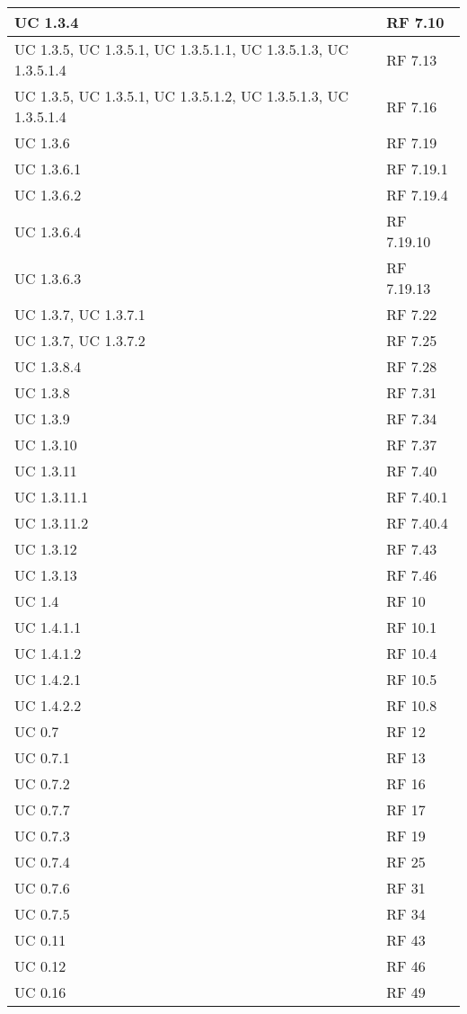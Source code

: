 {\begin{longtable} [c]{| p{4cm} | p{4cm} |}
 \hline 
UC 1.3.4 & RF 7.10\\ 
 \hline 
UC 1.3.5, UC 1.3.5.1, UC 1.3.5.1.1, UC 1.3.5.1.3, UC 1.3.5.1.4 & RF 7.13\\ 
 \hline 
UC 1.3.5, UC 1.3.5.1, UC 1.3.5.1.2, UC 1.3.5.1.3, UC 1.3.5.1.4 & RF 7.16\\ 
 \hline 
UC 1.3.6 & RF 7.19\\ 
 \hline 
UC 1.3.6.1 & RF 7.19.1\\ 
 \hline 
UC 1.3.6.2 & RF 7.19.4\\ 
 \hline 
UC 1.3.6.4 & RF 7.19.10\\ 
 \hline 
UC 1.3.6.3 & RF 7.19.13\\ 
 \hline 
UC 1.3.7, UC 1.3.7.1 & RF 7.22\\ 
 \hline 
UC 1.3.7, UC 1.3.7.2 & RF 7.25\\ 
 \hline 
UC 1.3.8.4 & RF 7.28\\ 
 \hline 
UC 1.3.8 & RF 7.31\\ 
 \hline 
UC 1.3.9 & RF 7.34\\ 
 \hline 
UC 1.3.10 & RF 7.37\\ 
 \hline 
UC 1.3.11 & RF 7.40\\ 
 \hline 
UC 1.3.11.1 & RF 7.40.1\\ 
 \hline 
UC 1.3.11.2 & RF 7.40.4\\ 
 \hline 
UC 1.3.12 & RF 7.43\\ 
 \hline 
UC 1.3.13 & RF 7.46\\ 
 \hline 
UC 1.4 & RF 10\\ 
 \hline 
UC 1.4.1.1 & RF 10.1\\ 
 \hline 
UC 1.4.1.2 & RF 10.4\\ 
 \hline 
UC 1.4.2.1 & RF 10.5\\ 
 \hline 
UC 1.4.2.2 & RF 10.8\\ 
 \hline 
UC 0.7 & RF 12\\ 
 \hline 
UC 0.7.1 & RF 13\\ 
 \hline 
UC 0.7.2 & RF 16\\ 
 \hline 
UC 0.7.7 & RF 17\\ 
 \hline 
UC 0.7.3 & RF 19\\ 
 \hline 
UC 0.7.4 & RF 25\\ 
 \hline 
UC 0.7.6 & RF 31\\ 
 \hline 
UC 0.7.5 & RF 34\\ 
 \hline 
UC 0.11 & RF 43\\ 
 \hline 
UC 0.12 & RF 46\\ 
 \hline 
UC 0.16 & RF 49\\ 

\end{longtable}}
